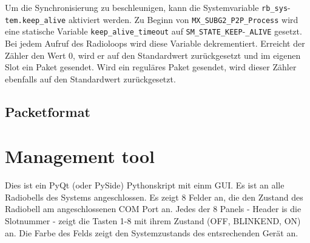 Um die Synchronisierung zu beschleunigen, kann die Systemvariable \verb|rb_sys|-\verb|tem.keep_alive| aktiviert werden. Zu Beginn von \verb|MX_SUBG2_P2P_Process| wird eine statische Variable \verb|keep_alive_timeout| auf \verb|SM_STATE_KEEP|-\verb|_ALIVE| gesetzt. Bei jedem Aufruf des Radioloops wird diese Variable dekrementiert. Erreicht der Zähler den Wert 0, wird er auf den Standardwert zurückgesetzt und im eigenen Slot ein Paket gesendet. Wird ein reguläres Paket gesendet, wird dieser Zähler ebenfalls auf den Standardwert zurückgesetzt.


\subsection{Packetformat}

\section{Management tool}
Dies ist ein PyQt (oder PySide) Pythonskript mit einm GUI. Es ist an alle Radiobells des Systems angeschlossen. Es zeigt 8 Felder an, die den Zustand des Radiobell am angeschlossenen COM Port an. Jedes der 8 Panels - Header is die Slotnummer - zeigt die Tasten 1-8 mit ihrem Zustand (OFF, BLINKEND, ON) an. Die Farbe des Felds  zeigt den Systemzustands des entsrechenden Gerät an. 

